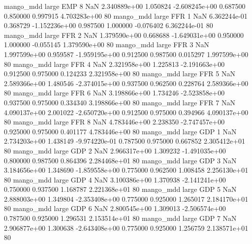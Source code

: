         mango_mdd      large      EMP                 8                  NaN 2.340889e+00      1.050824 -2.608245e+00 0.687500 0.850000       0.997915 4.703283e+00 80
        mango_mdd      large      FFR                 1                  NaN 6.362244e-01      0.368729 -1.152236e+00 0.987500 1.000000      -0.076402 6.362244e-01 80
        mango_mdd      large      FFR                 2                  NaN 1.379590e+00      0.668688 -1.649031e+00 0.950000 1.000000      -0.055145 1.379590e+00 80
        mango_mdd      large      FFR                 3                  NaN 1.997599e+00      0.959587 -1.959195e+00 0.912500 0.987500       0.015297 1.997599e+00 80
        mango_mdd      large      FFR                 4                  NaN 2.321958e+00      1.225813 -2.191663e+00 0.912500 0.975000       0.124233 2.321958e+00 80
        mango_mdd      large      FFR                 5                  NaN 2.589366e+00      1.480546 -2.374015e+00 0.937500 0.962500       0.228764 2.589366e+00 80
        mango_mdd      large      FFR                 6                  NaN 3.198866e+00      1.734246 -2.523858e+00 0.937500 0.975000       0.334340 3.198866e+00 80
        mango_mdd      large      FFR                 7                  NaN 4.090137e+00      2.001022 -2.650720e+00 0.912500 0.975000       0.394966 4.090137e+00 80
        mango_mdd      large      FFR                 8                  NaN 4.783446e+00      2.238350 -2.747457e+00 0.925000 0.975000       0.401177 4.783446e+00 80
        mango_mdd      large      GDP                 1                  NaN 2.734203e+00      1.438149 -9.974220e-01 0.787500 0.975000       0.667852 2.305412e+01 80
        mango_mdd      large      GDP                 2                  NaN 2.966317e+00      1.309232 -1.491035e+00 0.800000 0.987500       0.864396 2.284468e+01 80
        mango_mdd      large      GDP                 3                  NaN 3.184656e+00      1.348690 -1.859558e+00 0.775000 0.962500       1.008458 2.256130e+01 80
        mango_mdd      large      GDP                 4                  NaN 3.100386e+00      1.370938 -2.141241e+00 0.750000 0.937500       1.168787 2.221368e+01 80
        mango_mdd      large      GDP                 5                  NaN 2.888003e+00      1.349804 -2.353408e+00 0.775000 0.925000       1.265017 2.184170e+01 80
        mango_mdd      large      GDP                 6                  NaN 2.800545e+00      1.309013 -2.506574e+00 0.787500 0.925000       1.296531 2.153514e+01 80
        mango_mdd      large      GDP                 7                  NaN 2.906877e+00      1.300638 -2.643408e+00 0.775000 0.925000       1.256759 2.138571e+01 80

